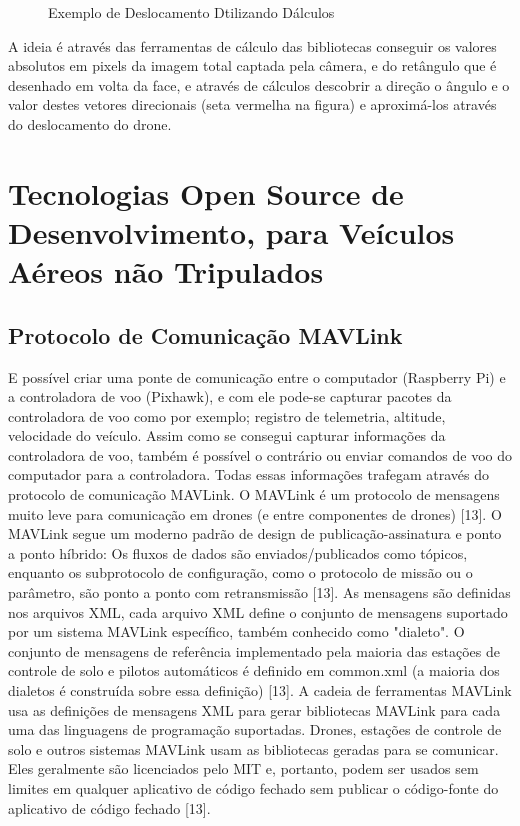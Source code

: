\begin{figure}[H]
	\centering
	\caption{Exemplo de Deslocamento Dtilizando Dálculos}
	\fontsize{9pt}{12pt}\selectfont
	\color{black}
	\def\svgwidth{15cm}
	
	\label{fig:desl}
\end{figure}

A ideia é através das ferramentas de cálculo das bibliotecas conseguir os valores absolutos em pixels da imagem total captada pela câmera, e do retângulo que é desenhado em volta da face, e através de cálculos descobrir a direção o ângulo e o valor destes vetores direcionais (seta vermelha na figura) e aproximá-los através do deslocamento do drone.

\section{Tecnologias Open Source de Desenvolvimento, para Veículos Aéreos não Tripulados}

\subsection{Protocolo de Comunicação MAVLink}
E possível criar uma ponte de comunicação entre o computador (Raspberry Pi) e a controladora de voo (Pixhawk), e com ele pode-se capturar pacotes da controladora de voo como por exemplo; registro de telemetria, altitude, velocidade do veículo.
Assim como se consegui capturar informações da controladora de voo, também é possível o contrário ou enviar comandos de voo do computador para a controladora. Todas essas informações trafegam através do protocolo de comunicação MAVLink.
O MAVLink é um protocolo de mensagens muito leve para comunicação em drones (e entre componentes de drones) [13].
O MAVLink segue um moderno padrão de design de publicação-assinatura e ponto a ponto híbrido: Os fluxos de dados são enviados/publicados como tópicos, enquanto os subprotocolo de configuração, como o protocolo de missão ou o parâmetro, são ponto a ponto com retransmissão [13].
As mensagens são definidas nos arquivos XML, cada arquivo XML define o conjunto de mensagens suportado por um sistema MAVLink específico, também conhecido como "dialeto". O conjunto de mensagens de referência implementado pela maioria das estações de controle de solo e pilotos automáticos é definido em common.xml (a maioria dos dialetos é construída sobre essa definição) [13].
A cadeia de ferramentas MAVLink usa as definições de mensagens XML para gerar bibliotecas MAVLink para cada uma das linguagens de programação suportadas. Drones, estações de controle de solo e outros sistemas MAVLink usam as bibliotecas geradas para se comunicar. Eles geralmente são licenciados pelo MIT e, portanto, podem ser usados sem limites em qualquer aplicativo de código fechado sem publicar o código-fonte do aplicativo de código fechado [13].

